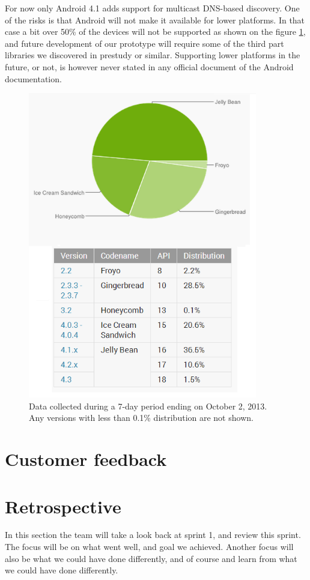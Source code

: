 For now only Android 4.1 adds support for multicast DNS-based discovery.
One of the risks is that Android will not make it available for lower platforms.
In that case a bit over 50\% of the devices will not be supported as shown on the figure \ref{fig:Platform_chart }, and future development of our prototype will require some of the third part libraries we discovered in prestudy or similar.
Supporting lower platforms in the future, or not, is however never stated in any official document of the Android documentation.

\begin{figure}[H]
	\centering
		\includegraphics[width=10cm]{sprint1/android_platform_chart.png}
	\caption{Data collected during a 7-day period ending on October 2, 2013. 
	Any versions with less than 0.1\% distribution are not shown.}
	\label{fig:Platform_chart }
\end{figure}

\section{Customer feedback}

\section{Retrospective}
In this section the team will take a look back at sprint 1, and review this sprint. The focus will be on what went well, and goal we achieved. Another focus will also be what we could have done differently, and of course and learn from what we could have done differently.


